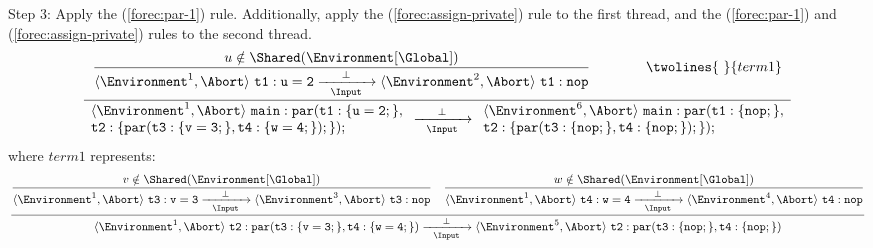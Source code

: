 \noindent
Step 3: Apply the (\ref{forec:par-1}) rule. Additionally, apply the 
(\ref{forec:assign-private}) rule to the first thread, and the 
(\ref{forec:par-1}) and (\ref{forec:assign-private})
rules to the second thread.
\begin{equation*}
	\frac{
		\dfrac{
				u \notin \Shared(\Environment[\Global])
			}{
				\langle \Environment^1, \Abort \rangle ~ \mathtt{t1: u=2}
					\xrightarrow[~~\Input~~]{\bot} 
				\langle \Environment^2, \Abort \rangle ~ \mathtt{t1: nop}
			}
			\qquad
			\qquad
			\twolines{
				~
			}{
				term1
			}
		}{
			\begin{array}{l}
				\langle \Environment^1, \Abort \rangle ~ \mathtt{main: par(t1:\{u=2;\},}	\\
				\mathtt{t2:\{par(t3:\{v=3;\}, t4:\{w=4;\} );\});}			\\
			\end{array}
				\xrightarrow[~~\Input~~]{\bot} 
			\begin{array}{l}
				\langle \Environment^6, \Abort \rangle ~ \mathtt{main: par(t1:\{nop;\},}	\\
				\mathtt{t2:\{par( t3:\{nop;\},t4:\{nop;\} );\} );}			\\
			\end{array}
		}
\end{equation*}
where $term1$ represents:
\begin{equation*}
	\frac{
		\dfrac{
				v \notin \Shared(\Environment[\Global])
			}{
				\langle \Environment^1, \Abort \rangle ~ \mathtt{t3:v=3}
					\xrightarrow[~~\Input~~]{\bot} 
				\langle \Environment^3, \Abort \rangle ~ \mathtt{t3:nop}
			}
			\quad
		\dfrac{
				w \notin \Shared(\Environment[\Global])
			}{
				\langle \Environment^1, \Abort \rangle ~ \mathtt{t4:w=4}
					\xrightarrow[~~\Input~~]{\bot} 
				\langle \Environment^4, \Abort \rangle ~ \mathtt{t4:nop}
			}
		}{
			\langle \Environment^1, \Abort \rangle ~ \mathtt{t2:par(t3:\{v=3;\},t4:\{w=4;\} )}
				\xrightarrow[~~\Input~~]{\bot} 
			\langle \Environment^5, \Abort \rangle ~ \mathtt{t2:par( t3:\{nop;\},t4:\{nop;\} )}
		}
\end{equation*}

